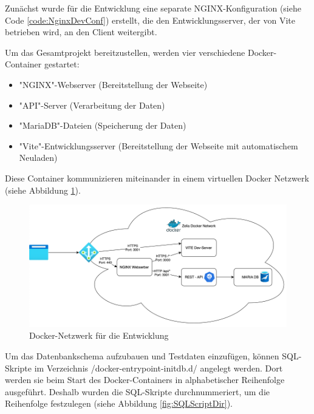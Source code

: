 
Zunächst wurde für die Entwicklung eine separate NGINX-Konfiguration (siehe Code \ref{code:NginxDevConf}) erstellt, die den Entwicklungsserver, der von Vite betrieben wird, an den Client weitergibt.


Um das Gesamtprojekt bereitzustellen, werden vier verschiedene Docker-Container gestartet:

\begin{itemize}
    \item "NGINX"-Webserver (Bereitstellung der Webseite)
    \item "API"-Server (Verarbeitung der Daten)
    \item "MariaDB"-Dateien (Speicherung der Daten)
    \item "Vite"-Entwicklungsserver (Bereitstellung der Webseite mit automatischem Neuladen)
\end{itemize}

Diese Container kommunizieren miteinander in einem virtuellen Docker Netzwerk (siehe Abbildung \ref{fig:DockerDevNetwork}). 

\begin{figure}[H]
    \centering
    \includegraphics{media/Docker/DevNetwork.png}
    \caption{Docker-Netzwerk für die Entwicklung}
    \label{fig:DockerDevNetwork}
\end{figure}

Um das Datenbankschema aufzubauen und Testdaten einzufügen, können SQL-Skripte im Verzeichnis {\ttfamily /docker-entrypoint-initdb.d/} angelegt werden. Dort werden sie beim Start des Docker-Containers in alphabetischer Reihenfolge ausgeführt. Deshalb wurden die SQL-Skripte durchnummeriert, um die Reihenfolge festzulegen (siehe Abbildung \ref{fig:SQLScriptDir}).

